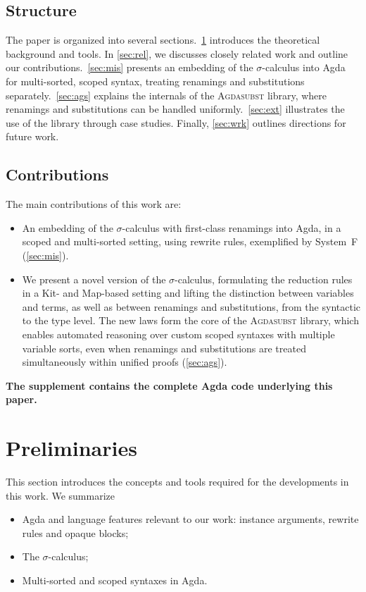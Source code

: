 \documentclass[screen,nonacm]{acmart}
\begin{document}
\subsection*{Structure}
The paper is organized into several sections.\ \cref{sec:pre} introduces the
theoretical background and tools. In \cref{sec:rel}, we discusses closely
related work and outline our contributions.\ \cref{sec:mis} presents an
embedding of the $σ$-calculus into Agda for multi-sorted, scoped syntax,
treating renamings and substitutions separately.\ \cref{sec:ags} explains the
internals of the \textsc{Agdasubst} library, where renamings and substitutions
can be handled uniformly.\ \cref{sec:ext} illustrates the use of the library
through case studies. Finally, \cref{sec:wrk} outlines directions for future
work.

\subsection*{Contributions}
The main contributions of this work are:
\begin{itemize}
      \item An embedding of the $σ$-calculus with first-class renamings into Agda, in a
            scoped and multi-sorted setting, using rewrite rules, exemplified by System~F
            (\cref{sec:mis}).
      \item We present a novel version of the $σ$-calculus, formulating the reduction rules
            in a Kit- and Map-based setting and lifting the distinction between variables
            and terms, as well as between renamings and substitutions, from the syntactic
            to the type level. The new laws form the core of the \textsc{Agdasubst}
            library, which enables automated reasoning over custom scoped syntaxes with
            multiple variable sorts, even when renamings and substitutions are treated
            simultaneously within unified proofs (\cref{sec:ags}).
\end{itemize}

\noindent\textbf{The supplement contains the complete Agda code underlying this paper.}

\section{Preliminaries}\label{sec:pre}
This section introduces the concepts and tools required for the developments in
this work. We summarize
\begin{itemize}
      \item Agda and language features relevant to our work: instance arguments, rewrite
            rules and opaque blocks;
      \item The $σ$-calculus;
      \item Multi-sorted and scoped syntaxes in Agda.
\end{itemize}
\end{document}
